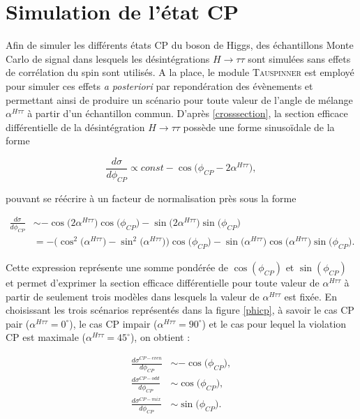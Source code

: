 \section{Simulation de l'état CP}
\label{CPsim}

Afin de simuler les différents états CP du boson de Higgs, des échantillons Monte Carlo de signal dans lesquels les désintégrations $H\rightarrow\tau\tau$ sont simulées sans effets de corrélation du spin sont utilisés. A la place, le module \textsc{Tauspinner} \cite{Czyczula2012,Przedzinski2014} est employé pour simuler ces effets \textit{a posteriori} par repondération des évènements et permettant ainsi de produire un scénario pour toute valeur de l'angle de mélange $\alpha^{H\tau\tau}$ à partir d'un échantillon commun. D'après \ref{crosssection}, la section efficace différentielle de la désintégration $H\rightarrow\tau\tau$ possède une forme sinusoïdale de la forme 

\begin{equation}
    \frac{d\sigma}{d\phi_{CP}}\propto const-\cos\bigl(\phi_{CP}-2\alpha^{H\tau\tau}\bigr),
\end{equation}

pouvant se réécrire à un facteur de normalisation près sous la forme

\begin{align*}
    \frac{d\sigma}{d\phi_{CP}} & \sim-\cos\bigl(2\alpha^{H\tau\tau}\bigr)\cos\bigl(\phi_{CP}\bigr)-\sin\bigl(2\alpha^{H\tau\tau}\bigr)\sin\bigl(\phi_{CP}\bigr) \\
    & = -\bigl(\cos^2\bigl(\alpha^{H\tau\tau}\bigr)-\sin^2\bigl(\alpha^{H\tau\tau}\bigr)\bigr)\cos\bigl(\phi_{CP}\bigr)-\sin\bigl(\alpha^{H\tau\tau}\bigr)\cos\bigl(\alpha^{H\tau\tau}\bigr)\sin\bigl(\phi_{CP}\bigr).
\end{align*}

Cette expression représente une somme pondérée de $\cos(\phi_{CP})$ et $\sin(\phi_{CP})$ et permet d'exprimer la section efficace différentielle pour toute valeur de $\alpha^{H\tau\tau}$ à partir de seulement trois modèles dans lesquels la valeur de $\alpha^{H\tau\tau}$ est fixée. En choisissant les trois scénarios représentés dans la figure \ref{phicp}, à savoir le cas CP pair ($\alpha^{H\tau\tau}=0^\circ$), le cas CP impair ($\alpha^{H\tau\tau}=90^\circ$) et le cas pour lequel la violation CP est maximale ($\alpha^{H\tau\tau}=45^\circ$), on obtient :

\begin{align}
    \frac{d\sigma^{CP-even}}{d\phi_{CP}} & \sim -\cos\bigl(\phi_{CP}\bigr), \\[1em]
    \frac{d\sigma^{CP-odd}}{d\phi_{CP}} & \sim \cos\bigl(\phi_{CP}\bigr), \\[1em]
    \frac{d\sigma^{CP-mix}}{d\phi_{CP}} & \sim \sin\bigl(\phi_{CP}\bigr).   
\end{align}

